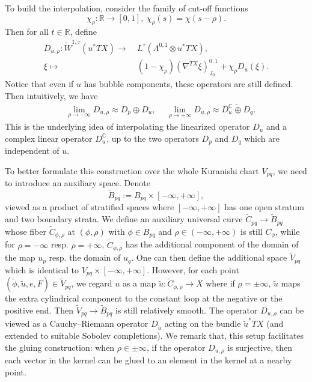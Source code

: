 \documentclass[reqno, 10pt]{amsart}
\numberwithin{equation}{section}
\numberwithin{equation}{section}
\theoremstyle{definition}
\theoremstyle{remark}
\newcommand{\beq}{\begin{equation}}
\newcommand{\eeq}{\end{equation}}
\newcommand{\beqn}{\begin{equation*}}
\newcommand{\eeqn}{\end{equation*}}
\newcommand{\mb}{\mathbb}
\newcommand{\wt}{\widetilde}
\begin{document}
To build the interpolation, consider the family of cut-off functions
\beqn
\chi_\rho: {\mb R} \to [0, 1],\ \chi_\rho (s) = \chi( s- \rho).
\eeqn
Then for all $t \in {\mb R}$, define
\beq\label{family_CR_operator}
\begin{split}
D_{u,\rho}: \wt W^{1,\tau} (u^* TX) \to &\ L^\tau (\Lambda^{0,1}\otimes u^* TX),\\
\xi \mapsto &\ (1 - \chi_\rho) (\nabla^{TX} \xi)_{J_0}^{0,1} + \chi_\rho D_u (\xi).
\end{split}
\eeq
Notice that even if $u$ has bubble components, these operators are still defined. Then intuitively, we have
\begin{align*}
&\ \lim_{\rho \to -\infty} D_{u, \rho} \approx D_p \oplus D_u,\ &\ \lim_{\rho \to +\infty} D_{u, \rho } \approx D_u^{\mb C} \wt \oplus D_q.
\end{align*}
This is the underlying idea of interpolating the linearized operator $D_u$ and a complex linear operator $D_u^{\mb C}$, up to the two operators $D_p$ and $D_q$ which are independent of $u$.

To better formulate this construction over the whole Kuranishi chart $V_{pq}$, we need to introduce an auxiliary space. Denote
\beqn
\wt B_{pq}:= B_{pq} \times [-\infty, +\infty],
\eeqn
viewed as a product of stratified spaces where $[-\infty, +\infty]$ has one open stratum and two boundary strata. We define an auxiliary universal curve $\wt C_{pq} \to \wt B_{pq}$ whose fiber $\wt C_{\phi, \rho}$ at $(\phi, \rho)$ with $\phi \in B_{pq}$ and $\rho \in (-\infty, +\infty)$ is still $C_\phi$, while for $\rho = -\infty$ resp. $\rho = +\infty$, $\wt C_{\phi, \rho}$ has the additional component of the domain of the map $u_p$ resp. the domain of $u_q$. One can then define the additional space $\wt V_{pq}$ which is identical to $V_{pq} \times [-\infty, +\infty]$. However, for each point $(\wt\phi, \wt u, e, F) \in \wt V_{pq}$, we regard $u$ as a map $\wt u: \wt C_{\phi, \rho} \to X$ where if $\rho = \pm\infty$, $\wt u$ maps the extra cylindrical component to the constant loop at the negative or the positive end. Then $\wt V_{pq} \to \wt B_{pq}$ is still relatively smooth. The operator $D_{u,  \rho}$ can be viewed as a Cauchy--Riemann operator $D_{\wt u}$ acting on the bundle $\wt u^* TX$ (and extended to suitable Sobolev completions). We remark that, this setup facilitates the gluing construction: when $\rho \in \pm\infty$, if the operator $D_{u, \rho}$ is surjective, then each vector in the kernel can be glued to an element in the kernel at a nearby point.  
\end{document}
